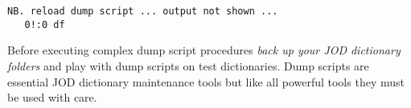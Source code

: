 \begin{enumerate}
\begin{lstlisting}[frame=single,framerule=0pt,basicstyle=\ttfamily\footnotesize]
   NB. reload dump script ... output not shown ...
   0!:0 df  
\end{lstlisting}

Before executing complex dump script procedures \emph{back up your JOD dictionary folders} and play with 
dump scripts on test dictionaries. Dump scripts are essential JOD dictionary maintenance tools but like
all powerful tools they must be used with care. 


\end{enumerate} 

